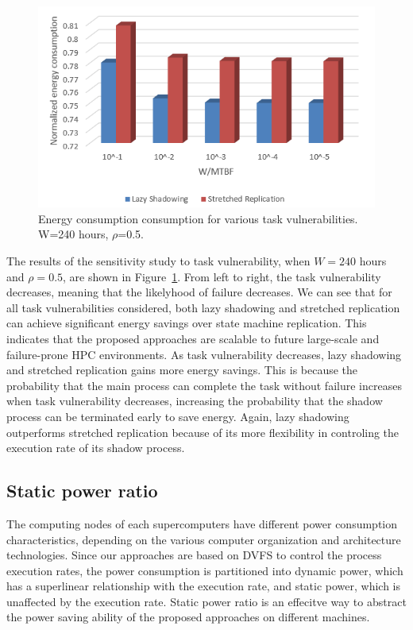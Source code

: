 \begin{figure}[!t]	
	\begin{center}
		\includegraphics[width=\columnwidth]{figures/vulnerability.png}
	\end{center}
	\caption{Energy consumption consumption for various task vulnerabilities. W=240 hours, $\rho$=0.5.}
	\label{fig:vulnerability}
\end{figure}

The results of the sensitivity study to task vulnerability, when $W=240$ hours and $\rho=0.5$, are shown in Figure~\ref{fig:vulnerability}. From left to right, the task vulnerability decreases, meaning that the likelyhood of failure decreases. We can see that for all task vulnerabilities considered, both lazy shadowing and stretched replication can achieve significant energy savings over state machine replication. This indicates that the proposed approaches are scalable to future large-scale and failure-prone HPC environments. As task vulnerability decreases, lazy shadowing and stretched replication gains more energy savings. This is because the probability that the main process can complete the task without failure increases when task vulnerability decreases, increasing the probability that the shadow process can be terminated early to save energy. Again, lazy shadowing outperforms stretched replication because of its more flexibility in controling the execution rate of its shadow process.

\subsection{Static power ratio}
The computing nodes of each supercomputers have different power consumption characteristics, depending on the various computer organization and architecture technologies. Since our approaches are based on DVFS to control the process execution rates, the power consumption is partitioned into dynamic power, which has a superlinear relationship with the execution rate, and static power, which is unaffected by the execution rate. Static power ratio is an effecitve way to abstract the power saving ability of the proposed approaches on different machines.

